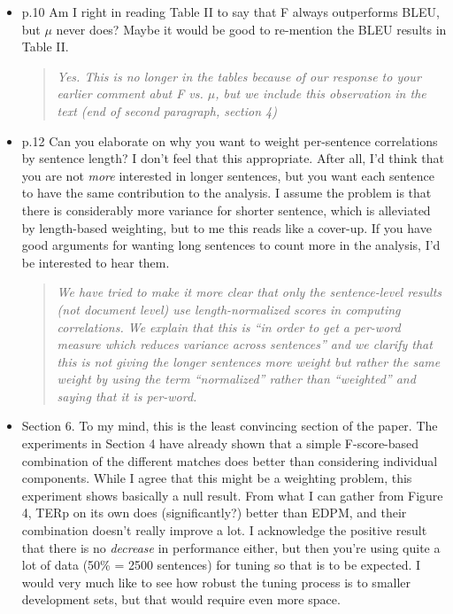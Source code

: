 \documentclass[letterpaper,12pt]{article}
\newenvironment{response}
{\begin{quotation} \it}
  {\end{quotation}}
\begin{document}
\begin{itemize}
\item  p.10 Am I right in reading Table II to say that F always
  outperforms BLEU, but $\mu$ never does? Maybe it would be good to
  re-mention the BLEU results in Table II.
  \begin{response}
   Yes.  This is no longer in the tables because of our response to
   your earlier comment abut F vs. $\mu$, but we include this observation
   in the text (end of second paragraph, section 4)
  \end{response}

\item  p.12 Can you elaborate on why you want to weight per-sentence
  correlations by sentence length? I don't feel that this
  appropriate. After all, I'd think that you are not \emph{more}
  interested in longer sentences, but you want each sentence to have
  the same contribution to the analysis. I assume the problem is that
  there is considerably more variance for shorter sentence, which is
  alleviated by length-based weighting, but to me this reads like a
  cover-up. If you have good arguments for wanting long sentences to
  count more in the analysis, I'd be interested to hear them.
  \begin{response}
  We have tried to make it more clear that only the sentence-level results (not document level) use length-normalized scores in computing correlations. We explain that this is ``in order to get a per-word measure which reduces variance across sentences'' and we clarify that this is not giving the longer sentences more weight but rather the same weight by using the term ``normalized'' rather than ``weighted'' and saying that it is per-word.
  \end{response}

\item  Section 6. To my mind, this is the least convincing section of the
  paper. The experiments in Section 4 have already shown that a simple
  F-score-based combination of the different matches does better than
  considering individual components. While I agree that this might be
  a weighting problem, this experiment shows basically a null result.
  From what I can gather from Figure 4, TERp on its own does
  (significantly?) better than EDPM, and their combination doesn't
  really improve a lot. I acknowledge the positive result that there
  is no \emph{decrease} in performance either, but then you're using
  quite a lot of data (50\% = 2500 sentences) for tuning so that is to
  be expected. I would very much like to see how robust the tuning
  process is to smaller development sets, but that would require even
  more space.
\end{itemize}
\end{document}
